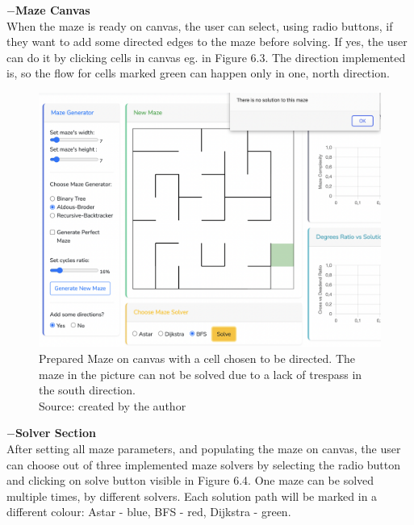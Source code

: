 \newline   
\textbf{$-$Maze Canvas}\\
When the maze is ready on canvas, the user can select, using radio buttons, if they want to add some directed edges to the maze before solving. If yes, the user can do it 
by clicking cells in canvas eg. in Figure 6.3. The direction implemented is, so the flow for cells marked green can happen only in one, north direction.\\
\begin{figure}[!h]
    \centering
    \includegraphics[width=0.6\linewidth]{mazeDirection}
    \caption{Prepared Maze on canvas with a cell chosen to be directed. The maze in the picture can not be solved due to a lack of trespass in the south direction.\\Source: created by the author}
    \end{figure}
\newpage
\textbf{$-$Solver Section}\\
After setting all maze parameters, and populating the maze on canvas, the user can choose out of three implemented maze solvers by selecting the radio button
and clicking on solve button visible in Figure 6.4. One maze can be solved multiple times, by different solvers. Each solution path will be marked in a different colour: 
Astar - blue, BFS - red, Dijkstra - green.\\
